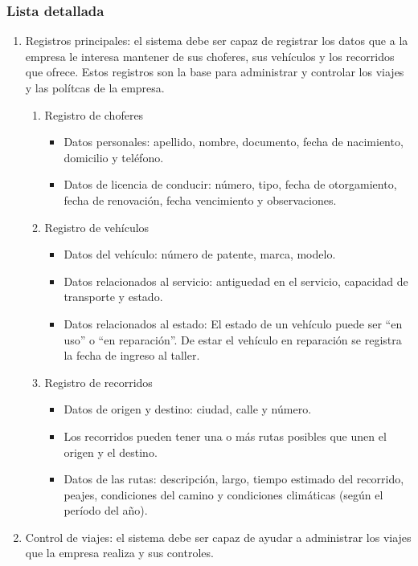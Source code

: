 \subsubsection{Lista detallada}
\begin{enumerate}
\item Registros principales: el sistema debe ser capaz de registrar los datos que a la empresa le interesa mantener de sus choferes,
  sus veh\'iculos y los recorridos que ofrece. Estos registros son la base para administrar y controlar los viajes y las pol\'itcas de la empresa.
  \begin{enumerate}[label=\roman{*}]
  \item Registro de choferes
    \begin{itemize}
      \item Datos personales: apellido, nombre, documento, fecha de nacimiento, domicilio y tel\'efono.
      \item Datos de licencia de conducir: n\'umero, tipo, fecha de otorgamiento, fecha de renovaci\'on, fecha vencimiento y observaciones.
    \end{itemize}
  \item Registro de veh\'iculos
    \begin{itemize}
      \item Datos del veh\'iculo: n\'umero de patente, marca, modelo.
      \item Datos relacionados al servicio: antiguedad en el servicio, capacidad de transporte y estado.
      \item Datos relacionados al estado: El estado de un veh\'iculo puede ser ``en uso'' o ``en reparaci\'on''. 
      De estar el veh\'iculo en reparaci\'on se registra la fecha de ingreso al taller.
    \end{itemize}
  \item Registro de recorridos
    \begin{itemize}
      \item Datos de origen y destino: ciudad, calle y n\'umero.
      \item Los recorridos pueden tener una o m\'as rutas posibles que unen el origen y el destino.
      \item Datos de las rutas: descripci\'on, largo, tiempo estimado del recorrido, peajes, condiciones
      del camino y condiciones clim\'aticas (seg\'un el per\'iodo del a\~no).
    \end{itemize}  
  \end{enumerate}
\item Control de viajes: el sistema debe ser capaz de ayudar a administrar los viajes que la empresa realiza y sus controles.

\end{enumerate}
